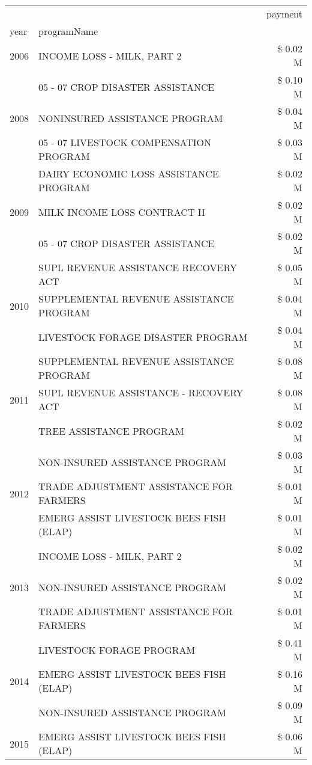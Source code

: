 \begin{tabular}{llr}
\toprule
 &  & payment \\
year & programName &  \\
\midrule
2006 & INCOME LOSS - MILK, PART 2 & \$ 0.02 M \\
\cline{1-3}
\multirow[t]{3}{*}{2008} & 05 - 07 CROP DISASTER ASSISTANCE & \$ 0.10 M \\
 & NONINSURED ASSISTANCE PROGRAM & \$ 0.04 M \\
 & 05 - 07 LIVESTOCK COMPENSATION PROGRAM & \$ 0.03 M \\
\cline{1-3}
\multirow[t]{3}{*}{2009} & DAIRY ECONOMIC LOSS ASSISTANCE PROGRAM & \$ 0.02 M \\
 & MILK INCOME LOSS CONTRACT II & \$ 0.02 M \\
 & 05 - 07 CROP DISASTER ASSISTANCE & \$ 0.02 M \\
\cline{1-3}
\multirow[t]{3}{*}{2010} & SUPL REVENUE ASSISTANCE RECOVERY ACT & \$ 0.05 M \\
 & SUPPLEMENTAL REVENUE ASSISTANCE PROGRAM & \$ 0.04 M \\
 & LIVESTOCK FORAGE DISASTER  PROGRAM & \$ 0.04 M \\
\cline{1-3}
\multirow[t]{3}{*}{2011} & SUPPLEMENTAL REVENUE ASSISTANCE PROGRAM & \$ 0.08 M \\
 & SUPL REVENUE ASSISTANCE - RECOVERY ACT & \$ 0.08 M \\
 & TREE ASSISTANCE PROGRAM & \$ 0.02 M \\
\cline{1-3}
\multirow[t]{3}{*}{2012} & NON-INSURED ASSISTANCE PROGRAM & \$ 0.03 M \\
 & TRADE ADJUSTMENT ASSISTANCE FOR FARMERS & \$ 0.01 M \\
 & EMERG ASSIST LIVESTOCK BEES FISH (ELAP) & \$ 0.01 M \\
\cline{1-3}
\multirow[t]{3}{*}{2013} & INCOME LOSS - MILK, PART 2 & \$ 0.02 M \\
 & NON-INSURED ASSISTANCE PROGRAM & \$ 0.02 M \\
 & TRADE ADJUSTMENT ASSISTANCE FOR FARMERS & \$ 0.01 M \\
\cline{1-3}
\multirow[t]{3}{*}{2014} & LIVESTOCK FORAGE PROGRAM & \$ 0.41 M \\
 & EMERG ASSIST LIVESTOCK BEES FISH (ELAP) & \$ 0.16 M \\
 & NON-INSURED ASSISTANCE PROGRAM & \$ 0.09 M \\
\cline{1-3}
\multirow[t]{3}{*}{2015} & EMERG ASSIST LIVESTOCK BEES FISH (ELAP) & \$ 0.06 M \\

\end{tabular}
